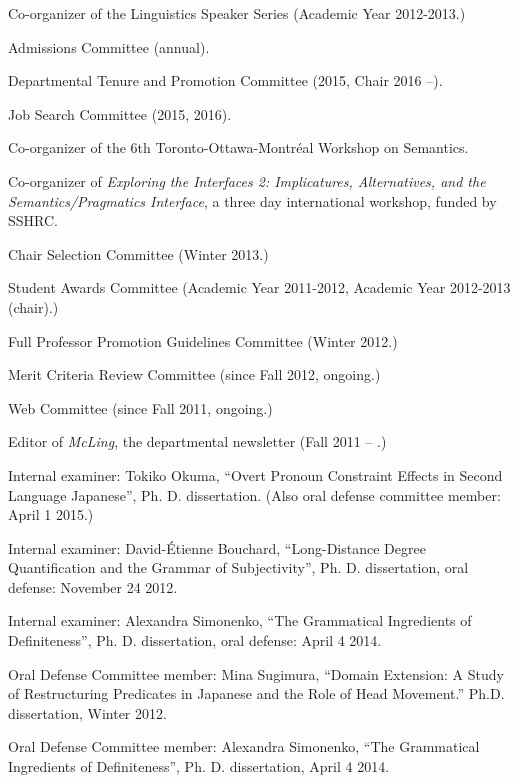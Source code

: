 \documentclass[11pt]{article}
\begin{document}

Co-organizer of the Linguistics Speaker Series (Academic Year 2012-2013.)


Admissions Committee (annual).

Departmental Tenure and Promotion Committee (2015, Chair 2016 --).

Job Search Committee (2015, 2016).

Co-organizer of the 6th Toronto-Ottawa-Montr\'eal Workshop on
Semantics.

Co-organizer of \textit{Exploring the Interfaces 2: Implicatures,
  Alternatives, and the Semantics/Pragmatics Interface}, a three day
international workshop, funded by SSHRC.

Chair Selection Committee (Winter 2013.)


Student Awards Committee (Academic Year 2011-2012, Academic Year
2012-2013 (chair).)


Full Professor Promotion Guidelines Committee (Winter 2012.)


Merit Criteria Review Committee (since Fall 2012, ongoing.)

Web Committee  (since Fall 2011, ongoing.)

Editor of \textit{McLing}, the departmental newsletter (Fall 2011 --
.)

Internal examiner:  Tokiko Okuma, ``Overt Pronoun Constraint Effects in Second Language Japanese'', Ph. D. dissertation. (Also oral defense committee member: April 1 2015.)

Internal examiner:  David-\'Etienne Bouchard, ``Long-Distance Degree Quantification and the
Grammar of Subjectivity'', Ph. D. dissertation, oral defense: November
24 2012.

Internal examiner:  Alexandra Simonenko, ``The Grammatical Ingredients
of Definiteness'', Ph. D. dissertation, oral defense: April 4 2014.

Oral Defense Committee member: Mina Sugimura, ``Domain Extension:  A Study of Restructuring
Predicates in Japanese and the Role of Head Movement.''
Ph.D. dissertation, Winter 2012. 

Oral Defense Committee member:   Alexandra Simonenko, ``The Grammatical Ingredients
of Definiteness'', Ph. D. dissertation, April 4 2014.
\end{document}
